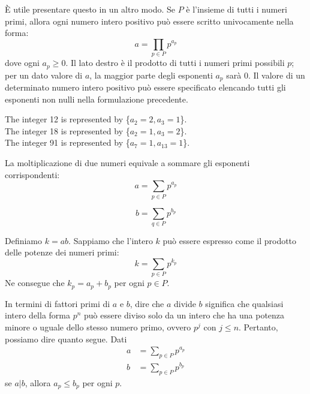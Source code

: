 \documentclass{article}
\theoremstyle{definition}
\begin{document}
È utile presentare questo in un altro modo. Se \( P \) è l'insieme di tutti i numeri primi, allora ogni numero intero positivo può essere scritto univocamente nella forma:
\[ a = \prod_{p \in P} p^{a_p} \]
dove ogni \( a_p \geq 0 \). Il lato destro è il prodotto di tutti i numeri primi possibili \( p \); per un dato valore di \( a \), la maggior parte degli esponenti \( a_p \) sarà 0. Il valore di un determinato numero intero positivo può essere specificato elencando tutti gli esponenti non nulli nella formulazione precedente.
\begin{center}
\begin{minipage}{0.8\textwidth} %
\begin{shaded}
\noindent
The integer 12 is represented by \{$a_2 = 2, a_3 = 1$\}. \\
The integer 18 is represented by \{$a_2 = 1, a_3 = 2$\}. \\
The integer 91 is represented by \{$a_7 = 1, a_{13} = 1$\}.
\end{shaded}
\end{minipage}
\end{center}

La moltiplicazione di due numeri equivale a sommare gli esponenti corrispondenti:
\begin{equation*}
a = \sum_{p \in P} p^{a_p}
\end{equation*}


\begin{equation*}
b = \sum_{q \in P} p^{b_p}
\end{equation*}


Definiamo \( k = ab \). Sappiamo che l'intero \( k \) può essere espresso come il prodotto delle potenze dei numeri primi: 
\begin{equation*}
k = \sum_{p \in P} p^{k_p}
\end{equation*}
Ne consegue che \( k_p = a_p + b_p \) per ogni \( p \in P \).


In termini di fattori primi di \( a \) e \( b \), dire che \( a \) divide \( b \) significa che qualsiasi intero della forma \( p^n \) può essere diviso solo da un intero che ha una potenza 
minore o uguale dello stesso numero primo, ovvero \( p^j \) con \( j \leq n \). Pertanto, possiamo dire quanto segue.
Dati
\begin{align*}
a &= \sum_{p \in P} p^{a_p} \\
b &= \sum_{p \in P} p^{b_p}
\end{align*}
se \( a | b \), allora \( a_p \leq b_p \) per ogni \( p \).
\end{document}
